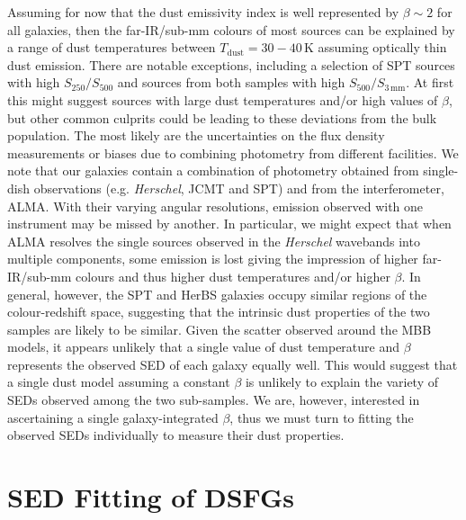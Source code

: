 Assuming for now that the dust emissivity index is well represented by $\beta \sim 2$ for all galaxies, then the far-IR/sub-mm colours of most sources can be explained by a range of dust temperatures between $T_{\textrm{dust}} = 30 - 40\,$K assuming optically thin dust emission. There are notable exceptions, including a selection of SPT sources with high $S_{250}/S_{500}$ and sources from both samples with high $S_{500}/S_{3\,\textrm{mm}}$. At first this might suggest sources with large dust temperatures and/or high values of $\beta$, but other common culprits could be leading to these deviations from the bulk population. The most likely are the uncertainties on the flux density measurements or biases due to combining photometry from different facilities. We note that our galaxies contain a combination of photometry obtained from single-dish observations (e.g. \textit{Herschel}, JCMT and SPT) and from the interferometer, ALMA. With their varying angular resolutions, emission observed with one instrument may be missed by another. In particular, we might expect that when ALMA resolves the single sources observed in the \textit{Herschel} wavebands into multiple components, some emission is lost giving the impression of higher far-IR/sub-mm colours and thus higher dust temperatures and/or higher $\beta$. In general, however, the SPT and HerBS galaxies occupy similar regions of the colour-redshift space, suggesting that the intrinsic dust properties of the two samples are likely to be similar. Given the scatter observed around the MBB models, it appears unlikely that a single value of dust temperature and $\beta$ represents the observed SED of each galaxy equally well. This would suggest that a single dust model assuming a constant $\beta$ is unlikely to explain the variety of SEDs observed among the two sub-samples. We are, however, interested in ascertaining a single galaxy-integrated $\beta$, thus we must turn to fitting the observed SEDs individually to measure their dust properties.

\section{SED Fitting of DSFGs}
\label{sec:sed_fitting}

